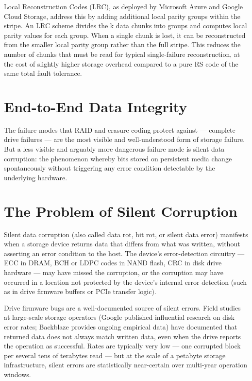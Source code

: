 Local Reconstruction Codes (LRC), as deployed by Microsoft Azure and Google Cloud Storage, address this by adding additional local parity groups within the stripe. An LRC scheme divides the k data chunks into groups and computes local parity values for each group. When a single chunk is lost, it can be reconstructed from the smaller local parity group rather than the full stripe. This reduces the number of chunks that must be read for typical single-failure reconstruction, at the cost of slightly higher storage overhead compared to a pure RS code of the same total fault tolerance.

\section{End-to-End Data Integrity}
The failure modes that RAID and erasure coding protect against --- complete drive failures --- are the most visible and well-understood form of storage failure. But a less visible and arguably more dangerous failure mode is silent data corruption: the phenomenon whereby bits stored on persistent media change spontaneously without triggering any error condition detectable by the underlying hardware.

\section{The Problem of Silent Corruption}
Silent data corruption (also called data rot, bit rot, or silent data error) manifests when a storage device returns data that differs from what was written, without asserting an error condition to the host. The device's error-detection circuitry --- ECC in DRAM, BCH or LDPC codes in NAND flash, CRC in disk drive hardware --- may have missed the corruption, or the corruption may have occurred in a location not protected by the device's internal error detection (such as in drive firmware buffers or PCIe transfer logic).

Drive firmware bugs are a well-documented source of silent errors. Field studies at large-scale storage operators (Google published influential research on disk error rates; Backblaze provides ongoing empirical data) have documented that returned data does not always match written data, even when the drive reports the operation as successful. Rates are typically very low --- one corrupted block per several tens of terabytes read --- but at the scale of a petabyte storage infrastructure, silent errors are statistically near-certain over multi-year operation windows.

